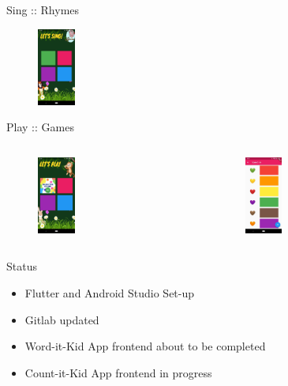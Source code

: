 \documentclass[14pt]{beamer}
\begin{document}
\begin{frame}{Sing :: Rhymes}
    \begin{figure}[ht]
    \includegraphics[height=1in]{Rhymes.jpeg}
    \end{figure}
\end{frame}

\begin{frame}{Play :: Games}
    \begin{columns}
    \begin{column}{0.5\textwidth}
        \begin{figure}[ht]
        \includegraphics[height=1in]{Games.jpeg}
        \end{figure}
    \end{column}
    \begin{column}{0.5\textwidth}
        \begin{figure}[ht]
        \includegraphics[height=1in]{FstGame.jpeg}
        \end{figure}
    \end{column}
    \end{columns}
\end{frame}

\begin{frame}{Status}
    \begin{itemize}
        \item Flutter and Android Studio Set-up
        \item Gitlab updated
        \item Word-it-Kid App frontend about to be completed
        \item Count-it-Kid App frontend in progress
    \end{itemize}
\end{frame}
\end{document}
